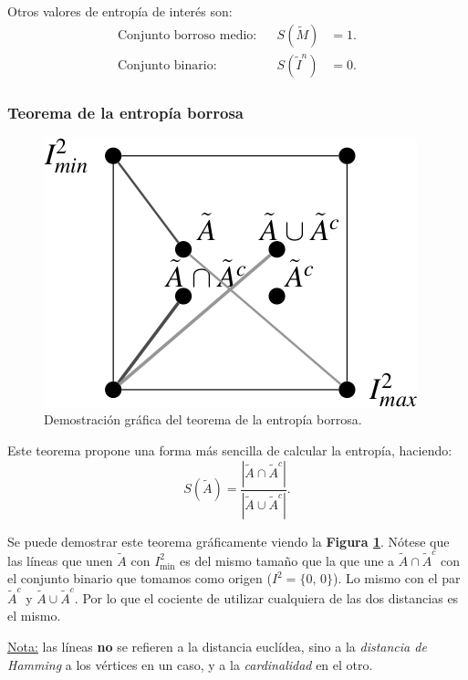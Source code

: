 \documentclass[10pt,a4paper]{article}
\begin{document}
Otros valores de entropía de interés son:
\begin{align*}
\text{Conjunto borroso medio:} && S(\tilde{M}) &= 1. \\
\text{Conjunto binario:} && S(\tilde{I}^n) &= 0.
\end{align*}

\subsubsection{Teorema de la entropía borrosa}

\begin{figure}
  \caption{Demostración gráfica del teorema de la entropía borrosa.}
  \label{fig:demo_entropia}
  \centerline{\includegraphics[width=0.3\textwidth-\fboxrule-\fboxrule]{imgs/demo_entropia.png}}
\end{figure}

Este teorema propone una forma más sencilla de calcular la entropía, haciendo:
\[
S(\tilde{A})=\frac{|\tilde{A} \cap \tilde{A}^c|}{|\tilde{A}\cup \tilde{A}^c|}.
\]

Se puede demostrar este teorema gráficamente viendo la \textbf{Figura \ref{fig:demo_entropia}}. Nótese que las líneas que unen $\tilde{A}$ con $I_{\min}^2$ es del mismo tamaño que la que une a $\tilde{A}\cap\tilde{A}^c$ con el conjunto binario que tomamos como origen ($I^2=\{0,\,0\}$). Lo mismo con el par $\tilde{A}^c$ y $\tilde{A}\cup\tilde{A}^c$. Por lo que el cociente de utilizar cualquiera de las dos distancias es el mismo.

\underline{Nota:} las líneas \textbf{no} se refieren a la distancia euclídea, sino a la \textit{distancia de Hamming} a los vértices en un caso, y a la \textit{cardinalidad} en el otro.
\end{document}
